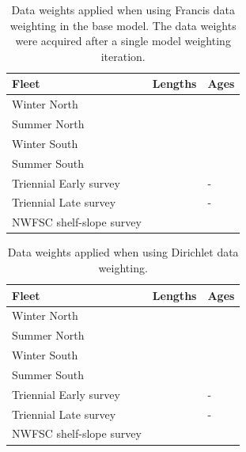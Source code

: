 \documentclass[12pt,]{article}
\begin{document}
\FloatBarrier 

\begin{table}[ht]
\centering
\caption{Data weights applied when using Francis data weighting in the base model. The data weights were acquired after a single model weighting iteration.} 
\label{tab:francis}
\begin{tabular}{>{\raggedright}p{2in}>{\centering}p{.7in}>{\centering}p{.7in}}
  \hline
Fleet & Lengths & Ages \\ 
  \hline
Winter North &  &  \\ 
  Summer North &  &  \\ 
  Winter South &  &  \\ 
  Summer South &  &  \\ 
  Triennial Early survey &  & - \\ 
  Triennial Late survey &  & - \\ 
  NWFSC shelf-slope survey &  &  \\ 
   \hline
\end{tabular}
\end{table}

\FloatBarrier 

\begin{table}[ht]
\centering
\caption{Data weights applied when using Dirichlet data weighting.} 
\label{tab:dirichlet}
\begin{tabular}{>{\raggedright}p{2in}>{\centering}p{.7in}>{\centering}p{.7in}}
  \hline
Fleet & Lengths & Ages \\ 
  \hline
Winter North &  &  \\ 
  Summer North &  &  \\ 
  Winter South &  &  \\ 
  Summer South &  &  \\ 
  Triennial Early survey &  & - \\ 
  Triennial Late survey &  & - \\ 
  NWFSC shelf-slope survey &  &  \\ 
   \hline
\end{tabular}
\end{table}

\FloatBarrier 

\newpage
\end{document}
